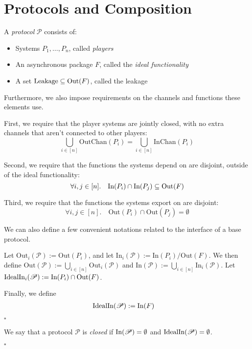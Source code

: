 \section{Protocols and Composition}

\begin{definition}[Protocols]
A \emph{protocol} $\mathscr{P}$ consists of:
\begin{itemize}
\item Systems $P_1, \ldots, P_n$, called \emph{players}
\item An asynchronous package $F$, called the \emph{ideal functionality}
\item A set $\text{Leakage} \subseteq \text{Out}(F)$, called the leakage
\end{itemize}

Furthermore, we also impose requirements on the channels and functions
these elements use.

First, we require that the player systems are jointly closed,
with no extra channels that aren't connected to other players:
$$
\bigcup_{i \in [n]} \text{OutChan}(P_i) = \bigcup_{i \in [n]} \text{InChan}(P_i)
$$

Second, we require that the functions the systems depend on are disjoint,
outside of the ideal functionality:
$$
\forall i, j \in [n].\quad \text{In}(P_i) \cap \text{In}(P_j) \subseteq \text{Out}(F)
$$

Third, we require that the functions the systems export on are disjoint:
$$
\forall i, j \in [n].\quad \text{Out}(P_i) \cap \text{Out}(P_j) = \emptyset
$$

We can also define a few convenient notations related to the interface of a base
protocol.

Let $\text{Out}_i(\mathscr{P}) := \text{Out}(P_i)$, and let $\text{In}_i(\mathscr{P}) := \text{In}(P_i) / \text{Out}(F)$.
We then define $\text{Out}(\mathscr{P}) := \bigcup_{i \in [n]} \text{Out}_i(\mathscr{P})$
and $\text{In}(\mathscr{P}) := \bigcup_{i \in [n]} \text{In}_i(\mathscr{P})$.
Let $\text{IdealIn}_i(\mathscr{P}) := \text{In}(P_i) \cap \text{Out}(F)$.

Finally, we define
$$
\begin{aligned}
&\text{IdealIn}(\mathscr{P}) := \text{In}(F)\cr
\end{aligned}
$$

$\square$
\end{definition}

\begin{definition}
  We say that a protocol $\mathscr{P}$ is \emph{closed} if
  $\text{In}(\mathscr{P}) = \emptyset$ and $\text{IdealIn}(\mathscr{P}) = \emptyset$.

  $\square$
\end{definition}

